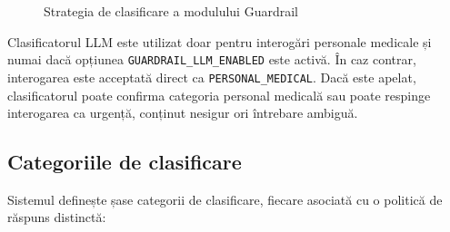 \documentclass[12pt, a4paper, oneside, romanian]{teza-upb}
\begin{document}
\begin{figure}[H]
\caption{Strategia de clasificare a modulului Guardrail}
\label{fig:guardrail}
\end{figure}

Clasificatorul LLM este utilizat doar pentru interogări personale medicale și numai dacă opțiunea \texttt{GUARDRAIL\_LLM\_ENABLED} este activă. În caz contrar, interogarea este acceptată direct ca \texttt{PERSONAL\_MEDICAL}. Dacă este apelat, clasificatorul poate confirma categoria personal medicală sau poate respinge interogarea ca urgență, conținut nesigur ori întrebare ambiguă.


\subsection{Categoriile de clasificare}

Sistemul definește șase categorii de clasificare, fiecare asociată cu o politică de răspuns distinctă:
\end{document}
